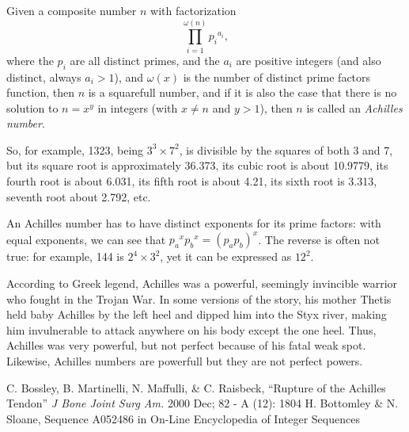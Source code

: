 \documentclass[12pt]{article}
\begin{document}
Given a composite number $n$ with factorization $$\prod_{i = 1}^{\omega(n)} {p_i}^{a_i},$$ where the $p_i$ are all distinct primes, and the $a_i$ are positive integers (and also distinct, always $a_i > 1$), and $\omega(x)$ is the number of distinct prime factors function, then $n$ is a squarefull number, and if it is also the case that there is no solution to $n = x^y$ in integers (with $x \ne n$ and $y > 1$), then $n$ is called an {\em Achilles number}.

So, for example, 1323, being $3^3 \times 7^2$, is divisible by the squares of both 3 and 7, but its square root is approximately 36.373, its cubic root is about 10.9779, its fourth root is about 6.031, its fifth root is about 4.21, its sixth root is 3.313, seventh root about 2.792, etc.

An Achilles number has to have distinct exponents for its prime factors: with equal exponents, we can see that ${p_a}^x {p_b}^x = (p_a p_b)^x$. The reverse is often not true: for example, 144 is $2^4 \times 3^2$, yet it can be expressed as $12^2$.

According to Greek legend, Achilles was a powerful, seemingly invincible warrior who fought in the Trojan War. In some versions of the story, his mother Thetis held baby Achilles by the left heel and dipped him into the Styx river, making him invulnerable to attack anywhere on his body except the one heel. Thus, Achilles was very powerful, but not perfect because of his fatal weak spot. Likewise, Achilles numbers are powerfull but they are not perfect powers.

\begin{thebibliography}{2}
 C. Bossley, B. Martinelli, N. Maffulli, \& C. Raisbeck, ``Rupture of the Achilles Tendon'' {\it J Bone Joint Surg Am.} 2000 Dec; 82 - A (12): 1804
 H. Bottomley \& N. Sloane, Sequence A052486 in On-Line Encyclopedia of Integer Sequences
\end{thebibliography}
\end{document}
